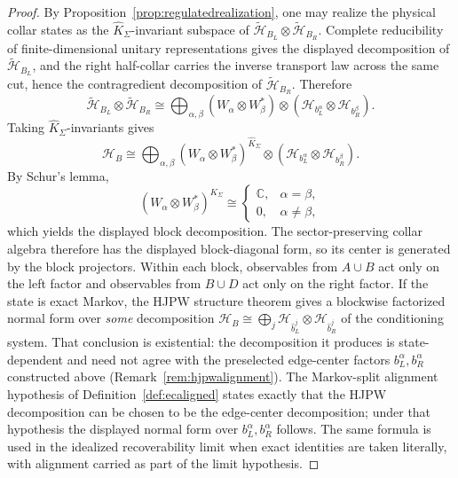 \documentclass[11pt]{article}
\begin{document}
\begin{proof}
By Proposition~\ref{prop:regulatedrealization}, one may realize the physical collar states as the \(\widehat K_\Sigma\)-invariant subspace of \(\tilde{\mathcal H}_{B_L}\otimes \tilde{\mathcal H}_{B_R}\). Complete reducibility of finite-dimensional unitary representations gives the displayed decomposition of \(\tilde{\mathcal H}_{B_L}\), and the right half-collar carries the inverse transport law across the same cut, hence the contragredient decomposition of \(\tilde{\mathcal H}_{B_R}\). Therefore
\[
\tilde{\mathcal H}_{B_L}\otimes \tilde{\mathcal H}_{B_R}
\cong
\bigoplus_{\alpha,\beta}
(W_\alpha\otimes W_\beta^*)\otimes
(\mathcal H_{b_L^\alpha}\otimes \mathcal H_{b_R^\beta}).
\]
Taking \(\widehat K_\Sigma\)-invariants gives
\[
\mathcal H_B
\cong
\bigoplus_{\alpha,\beta}
(W_\alpha\otimes W_\beta^*)^{\widehat K_\Sigma}\otimes
(\mathcal H_{b_L^\alpha}\otimes \mathcal H_{b_R^\beta}).
\]
By Schur's lemma,
\[
(W_\alpha\otimes W_\beta^*)^{\widehat K_\Sigma}
\cong
\begin{cases}
\mathbb C, & \alpha=\beta,\\
0, & \alpha\neq \beta,
\end{cases}
\]
which yields the displayed block decomposition. The sector-preserving collar algebra therefore has the displayed block-diagonal form, so its center is generated by the block projectors. Within each block, observables from \(A\cup B\) act only on the left factor and observables from \(B\cup D\) act only on the right factor. If the state is exact Markov, the HJPW structure theorem \cite{hjpw04} gives a blockwise factorized normal form over \emph{some} decomposition \(\mathcal H_B\cong\bigoplus_j \mathcal H_{\hat b_L^j}\otimes\mathcal H_{\hat b_R^j}\) of the conditioning system. That conclusion is existential: the decomposition it produces is state-dependent and need not agree with the preselected edge-center factors \(b_L^\alpha,b_R^\alpha\) constructed above (Remark~\ref{rem:hjpwalignment}). The Markov-split alignment hypothesis of Definition~\ref{def:ecaligned} states exactly that the HJPW decomposition can be chosen to be the edge-center decomposition; under that hypothesis the displayed normal form over \(b_L^\alpha,b_R^\alpha\) follows. The same formula is used in the idealized recoverability limit when exact identities are taken literally, with alignment carried as part of the limit hypothesis.
\end{proof}
\end{document}
